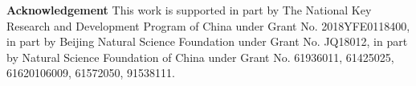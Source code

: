 \documentclass[10pt,twocolumn,letterpaper]{article}
\begin{document}
\vspace{5mm}
\noindent\textbf{Acknowledgement} This work is supported in part by The National Key Research and Development Program of China under Grant No. 2018YFE0118400, in part by Beijing Natural Science Foundation under Grant No. JQ18012, in part by Natural Science Foundation of China under Grant No. 61936011, 61425025, 61620106009, 61572050, 91538111.

{\small


}
\end{document}
